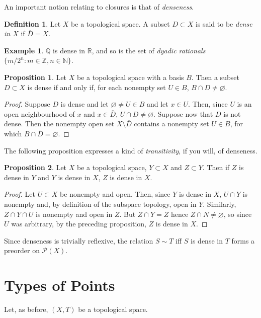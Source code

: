 \documentclass{book}
\theoremstyle{definition}
\newtheorem{proposition}{Proposition}[section]
\newtheorem{definition}{Definition}[section]
\newtheorem{example}{Example}[section]
\theoremstyle{remark}
\newcommand{\R}{\mathbb{R}}
\newcommand{\Z}{\mathbb{Z}}
\newcommand{\Q}{\mathbb{Q}}
\newcommand{\N}{\mathbb{N}}
\begin{document}
An important notion relating to closures is that of \textit{denseness}.
\begin{definition}
Let $X$ be a topological space. A subset $D\subset X$ is said to be \textit{dense in $X$} if $\overline D=X$.
\end{definition}
\begin{example}
$\Q$ is dense in $\R$, and so is the set of \textit{dyadic rationals} $\{m/2^n:m\in\Z,n\in\N\}$.
\end{example}

\begin{proposition}
Let $X$ be a topological space with a basis $B$. Then a subset $D\subset X$ is dense if and only if, for each nonempty set $U\in B$, $B\cap D\neq\varnothing$.
\end{proposition}
\begin{proof}
Suppose $D$ is dense and let $\varnothing\neq U\in B$ and let $x\in U$. Then, since $U$ is an open neighbourhood of $x$ and $x\in\overline D$, $U\cap D\neq\varnothing$. Suppose now that $D$ is not dense. Then the nonempty open set $X\setminus\overline D$ contains a nonempty set $U\in B$, for which $B\cap\overline D=\varnothing$.
\end{proof}

The following proposition expresses a kind of \textit{transitivity}, if you will, of denseness.

\begin{proposition}
Let $X$ be a topological space, $Y\subset X$ and $Z\subset Y$. Then if $Z$ is dense in $Y$ and $Y$ is dense in $X$, $Z$ is dense in $X$.
\end{proposition}
\begin{proof}
Let $U\subset X$ be nonempty and open. Then, since $Y$ is dense in $X$, $U\cap Y$ is nonempty and, by definition of the subspace topology, open in $Y$. Similarly, $Z\cap Y\cap U$ is nonempty and open in $Z$. But $Z\cap Y=Z$ hence $Z\cap N\neq\varnothing$, so since $U$ was arbitrary, by the preceding proposition, $Z$ is dense in $X$.
\end{proof}

Since denseness is trivially reflexive, the relation $S\sim T$ iff $S$ is dense in $T$ forms a preorder on $\mathcal P(X)$.

\section{Types of Points}
Let, as before, $(X,T)$ be a topological space.
\end{document}
